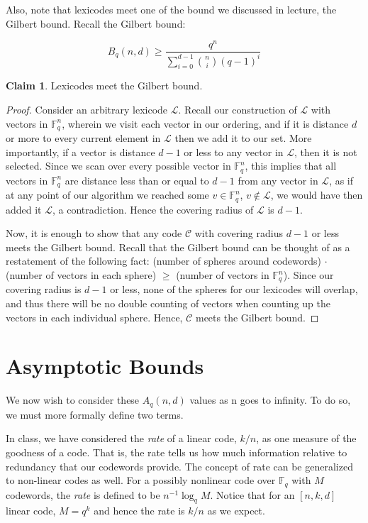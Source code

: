 \documentclass{article}
\numberwithin{theorem}{subsection}
\theoremstyle{definition}
\numberwithin{exmp}{subsection}
\theoremstyle{definition}
\numberwithin{defn}{subsection}
\theoremstyle{definition}
\newtheorem{claim}{Claim}
\numberwithin{claim}{subsection}
\begin{document}
Also, note that lexicodes meet one of the bound we discussed in lecture, the Gilbert bound.  Recall the Gilbert bound:

\begin{equation}
B_q(n,d) \ge \frac{q^n}{\sum_{i=0}^{d-1} \binom{n}{i}(q-1)^{i}}
\end{equation}

\begin{claim}
Lexicodes meet the Gilbert bound.
\end{claim}

\begin{proof}
Consider an arbitrary lexicode $\mathcal{L}$.  Recall our construction of $\mathcal{L}$ with vectors in $\mathbb{F}_q^n$, wherein we visit each vector in our ordering,
and if it is distance $d$ or more to every current element in $\mathcal{L}$ then we add it to our set.  More importantly, if a vector is distance $d-1$ or less to any vector in
$\mathcal{L}$, then it is not selected.  Since we scan over every possible vector in $\mathbb{F}_q^n$, this implies that all vectors in $\mathbb{F}_q^n$ are distance less than
or equal to $d-1$ from any vector in $\mathcal{L}$, as if at any point of our algorithm we reached some $v \in \mathbb{F}_q^n$, $v \not\in \mathcal{L}$,  we would have then
added it $\mathcal{L}$, a contradiction.  Hence the covering radius of $\mathcal{L}$ is $d-1$.  

Now, it is enough to show that any code $\mathcal{C}$ with covering radius $d-1$ or less meets the Gilbert bound.  Recall that the Gilbert bound can be thought of as a restatement of the 
following fact: (number of spheres around codewords) $\cdot$ (number of vectors in each sphere) $\ge$ (number of vectors in $\mathbb{F}_q^n$).  Since our covering radius
is $d-1$ or less, none of the spheres for our lexicodes will overlap, and thus there will be no double counting of vectors when counting up the vectors in each individual sphere.
Hence, $\mathcal{C}$ meets the Gilbert bound.
\end{proof} 





\section{Asymptotic Bounds}
We now wish to consider these $A_q(n,d)$ values as n goes to infinity.  To do so, we must more formally define two terms.

In class, we have considered the \textit{rate} of a linear code, $k/n$, as one measure of the goodness of a code.  That is,
the rate tells us how much information relative to redundancy that our codewords provide.  The concept of rate can be generalized
to non-linear codes as well.  For a possibly nonlinear code over $\mathbb{F}_q$ with $M$ codewords, the \textit{rate} is defined to be $n^{-1} \log_q {M}$.  Notice that
for an $[n,k,d]$ linear code, $M = q^k$ and hence the rate is $k/n$ as we expect.
\end{document}
